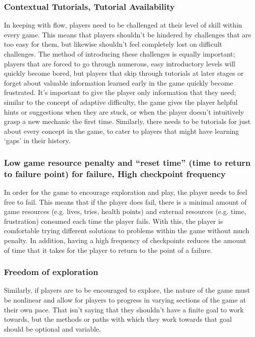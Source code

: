 \documentclass[12pt]{report}
\begin{document}
		\subsubsection{Contextual Tutorials, Tutorial Availability}
			In keeping with flow, players need to be challenged at their level of skill within every game. This means that players shouldn't be hindered by challenges that are too easy for them, but likewise shouldn't feel completely lost on difficult challenges. The method of introducing these challenges is equally important; players that are forced to go through numerous, easy introductory levels will quickly become bored, but players that skip through tutorials at later stages or forget about valuable information learned early in the game quickly become frustrated. It's important to give the player only information that they need; similar to the concept of adaptive difficulty, the game gives the player helpful hints or suggestions when they are stuck, or when the player doesn't intuitively grasp a new mechanic the first time. Similarly, there needs to be tutorials for just about every concept in the game, to cater to players that might have learning ‘gaps' in their history.
		\subsubsection{Low game resource penalty and “reset time” (time to return to failure point) for failure, High checkpoint frequency}
			In order for the game to encourage exploration and play, the player needs to feel free to fail. This means that if the player does fail, there is a minimal amount of game resources (e.g. lives, tries, health points) and external resources (e.g. time, frustration) consumed each time the player fails. With this, the player is comfortable trying different solutions to problems within the game without much penalty. In addition, having a high frequency of checkpoints reduces the amount of time that it takes for the player to return to the point of a failure.
		\subsubsection{Freedom of exploration}
			Similarly, if players are to be encouraged to explore, the nature of the game must be nonlinear and allow for players to progress in varying sections of the game at their own pace. That isn't saying that they shouldn't have a finite goal to work towards, but the methods or paths with which they work towards that goal should be optional and variable.
\end{document}
